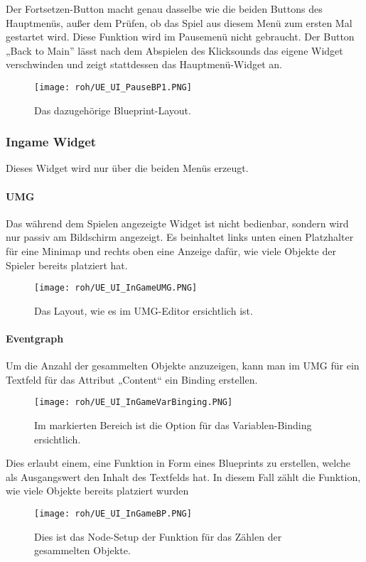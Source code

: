 Der Fortsetzen-Button macht genau dasselbe wie die beiden Buttons des Hauptmenüs, außer dem Prüfen, ob das Spiel aus diesem Menü zum ersten Mal gestartet wird. Diese Funktion wird im Pausemenü nicht gebraucht.
Der Button „Back to Main” lässt nach dem Abspielen des Klicksounds das eigene Widget verschwinden und zeigt stattdessen das Hauptmenü-Widget an.
\begin{figure}[H]
    \centering
    \texttt{[image: roh/UE\_UI\_PauseBP1.PNG]}
    \caption{Das dazugehörige Blueprint-Layout.}
    \label{UE:UI_PauseBP1}
\end{figure}
\subsubsection{Ingame Widget}
Dieses Widget wird nur über die beiden Menüs erzeugt.
\paragraph{UMG}
Das während dem Spielen angezeigte Widget ist nicht bedienbar, sondern wird nur passiv am Bildschirm angezeigt. Es beinhaltet links unten einen Platzhalter für eine Minimap und rechts oben eine Anzeige dafür, wie viele Objekte der Spieler bereits platziert hat.
\begin{figure}[H]
    \centering
    \texttt{[image: roh/UE\_UI\_InGameUMG.PNG]}
    \caption{Das Layout, wie es im UMG-Editor ersichtlich ist.}
    \label{UE:UI_InGameUMG}
\end{figure}
\paragraph{Eventgraph}
Um die Anzahl der gesammelten Objekte anzuzeigen, kann man im UMG für ein Textfeld für das Attribut „Content“ ein Binding erstellen.
\begin{figure}[H]
    \centering
    \texttt{[image: roh/UE\_UI\_InGameVarBinging.PNG]}
    \caption{Im markierten Bereich ist die Option für das Variablen-Binding ersichtlich.}
    \label{UE:UI_InGameVarBinging}
\end{figure}
Dies erlaubt einem, eine Funktion in Form eines Blueprints zu erstellen, welche als Ausgangswert den Inhalt des Textfelds hat.
In diesem Fall zählt die Funktion, wie viele Objekte bereits platziert wurden
\begin{figure}[H]
    \centering
    \texttt{[image: roh/UE\_UI\_InGameBP.PNG]}
    \caption{Dies ist das Node-Setup der Funktion für das Zählen der gesammelten Objekte.}
    \label{UE:UI_InGameBP}
\end{figure}

